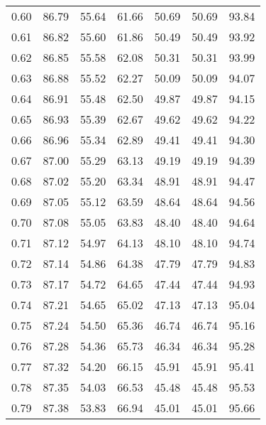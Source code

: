 \begin{tabular}{|c|c|c|c|c|c|c|}
      0.60 &     86.79 &     55.64 &      61.66 &   50.69 &      50.69 &         93.84 \\
      0.61 &     86.82 &     55.60 &      61.86 &   50.49 &      50.49 &         93.92 \\
      0.62 &     86.85 &     55.58 &      62.08 &   50.31 &      50.31 &         93.99 \\
      0.63 &     86.88 &     55.52 &      62.27 &   50.09 &      50.09 &         94.07 \\
      0.64 &     86.91 &     55.48 &      62.50 &   49.87 &      49.87 &         94.15 \\
      0.65 &     86.93 &     55.39 &      62.67 &   49.62 &      49.62 &         94.22 \\
      0.66 &     86.96 &     55.34 &      62.89 &   49.41 &      49.41 &         94.30 \\
      0.67 &     87.00 &     55.29 &      63.13 &   49.19 &      49.19 &         94.39 \\
      0.68 &     87.02 &     55.20 &      63.34 &   48.91 &      48.91 &         94.47 \\
      0.69 &     87.05 &     55.12 &      63.59 &   48.64 &      48.64 &         94.56 \\
      0.70 &     87.08 &     55.05 &      63.83 &   48.40 &      48.40 &         94.64 \\
      0.71 &     87.12 &     54.97 &      64.13 &   48.10 &      48.10 &         94.74 \\
      0.72 &     87.14 &     54.86 &      64.38 &   47.79 &      47.79 &         94.83 \\
      0.73 &     87.17 &     54.72 &      64.65 &   47.44 &      47.44 &         94.93 \\
      0.74 &     87.21 &     54.65 &      65.02 &   47.13 &      47.13 &         95.04 \\
      0.75 &     87.24 &     54.50 &      65.36 &   46.74 &      46.74 &         95.16 \\
      0.76 &     87.28 &     54.36 &      65.73 &   46.34 &      46.34 &         95.28 \\
      0.77 &     87.32 &     54.20 &      66.15 &   45.91 &      45.91 &         95.41 \\
      0.78 &     87.35 &     54.03 &      66.53 &   45.48 &      45.48 &         95.53 \\
      0.79 &     87.38 &     53.83 &      66.94 &   45.01 &      45.01 &         95.66 \\

\end{tabular}
